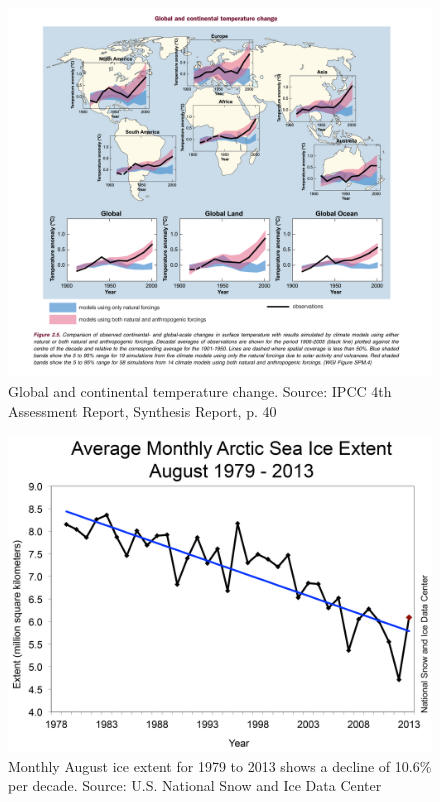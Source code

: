 \documentclass[10pt]{article}
\begin{document}
\begin{figure}
\includegraphics[width=160mm]{s2-attribution.PNG}
\centering
\caption{Global and continental temperature change. Source: IPCC 4th Assessment Report, Synthesis Report, p. 40}
\label{fig:CO2increase}
\end{figure}



\begin{figure}
\includegraphics[width=160mm]{s2-arctic-ice.png}
\centering
\caption{Monthly August ice extent for 1979 to 2013 shows a decline of 10.6\% per decade. Source: U.S. National Snow and Ice Data Center}
\label{fig:s2-arctic-ice}
\end{figure}
\end{document}
